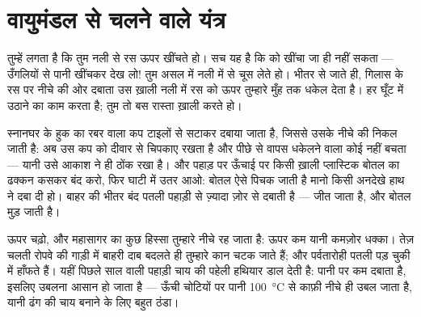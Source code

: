 \section{वायुमंडल से चलने वाले यंत्र}

\begin{example}[नली]\label{ex:g5:air-pressure-weather:straw}
तुम्हें लगता है कि तुम नली से रस ऊपर खींचते हो। सच यह है कि  को
खींचा जा ही नहीं सकता --- उँगलियों से पानी खींचकर देख लो! तुम असल में
नली में से \emph{} चूस लेते हो। भीतर से  जाते ही, गिलास के रस
पर नीचे की ओर दबाता  उस ख़ाली नली में रस को ऊपर तुम्हारे मुँह
तक धकेल देता है। हर घूँट में उठाने का काम  करता है; तुम तो बस
रास्ता ख़ाली करते हो।
\end{example}

\begin{example}[चूषण-कप और पिचकी बोतलें]\label{ex:g5:air-pressure-weather:suction}
स्नानघर के हुक का रबर वाला कप टाइलों से सटाकर दबाया जाता है, जिससे
उसके नीचे की  निकल जाती है: अब  उस कप को दीवार से चिपकाए
रखता है और पीछे से वापस धकेलने वाला कोई नहीं बचता --- यानी उसे आकाश ने
ही ठोंक रखा है। और पहाड़ पर ऊँचाई पर किसी ख़ाली प्लास्टिक बोतल का
ढक्कन कसकर बंद करो, फिर घाटी में उतर आओ: बोतल ऐसे पिचक जाती है मानो
किसी अनदेखे हाथ ने दबा दी हो। बाहर की  भीतर बंद पतली पहाड़ी  से
ज़्यादा ज़ोर से दबाती है ---  जीत जाता है, और बोतल मुड़ जाती
है।
\end{example}

\begin{example}[ऊँचाई के साथ पतली होती हवा]\label{ex:g5:air-pressure-weather:height}
ऊपर चढ़ो, और महासागर का कुछ हिस्सा तुम्हारे नीचे रह जाता है: ऊपर कम
 यानी कमज़ोर धक्का। तेज़ चलती रोपवे की गाड़ी में बाहरी दाब बदलते
ही तुम्हारे कान चटक जाते हैं; और पर्वतारोही पतली पड़ चुकी  में
हाँफते हैं। यहीं पिछले साल वाली पहाड़ी चाय की पहेली हथियार डाल देती
है:  पानी पर कम दबाता है, इसलिए उबलना आसान हो जाता है ---
ऊँची चोटियों पर पानी \qty{100}{\celsius} से काफ़ी नीचे ही उबल जाता
है, यानी ढंग की चाय बनाने के लिए बहुत ठंडा।
\end{example}

